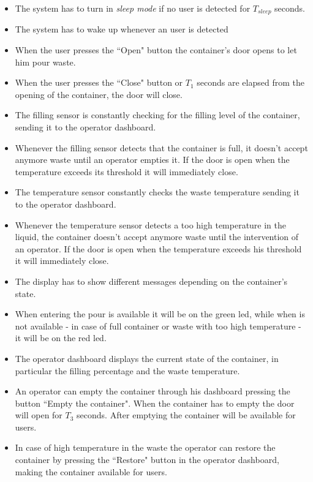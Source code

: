 \documentclass[a4paper,12pt]{report}
\begin{document}
            \begin{itemize}
                \item The system has to turn in \textit{sleep mode} if no user is detected for $T_{sleep}$ seconds. 
                \item The system has to wake up whenever an user is detected
                \item When the user presses the ``Open" button the container's door opens to let him pour waste.
                \item When the user presses the ``Close" button or $T_1$ seconds are elapsed from the opening of the container, the door will close. 
                \item The filling sensor is constantly checking for the filling level of the container, sending it to the operator dashboard. 
                \item Whenever the filling sensor detects that the container is full, it doesn't accept anymore waste until an operator empties it. If the door is open when the temperature exceeds its threshold it will immediately close. 
                \item The temperature sensor constantly checks the waste temperature sending it to the operator dashboard. 
                \item Whenever the temperature sensor detects a too high temperature in the liquid, the container doesn't accept anymore waste until the intervention of an operator. If the door is open when the temperature exceeds his threshold it will immediately close. 
                \item The display has to show different messages depending on the container's state. 
                \item When entering the pour is available it will be on the green led, while when is not available - in case of full container or waste with too high temperature - it will be on the red led.  
                \item The operator dashboard displays the current state of the container, in particular the filling percentage and the waste temperature. 
                \item An operator can empty the container through his dashboard pressing the button ``Empty the container". When the container has to empty the door will open for $T_3$ seconds. After emptying the container will be available for users. 
                \item In case of high temperature in the waste the operator can restore the container by pressing the ``Restore" button in the operator dashboard, making the container available for users.
            \end{itemize}
\end{document}
